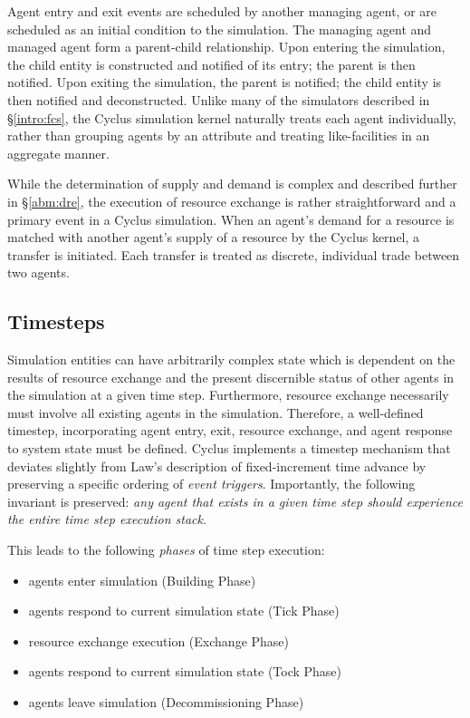 Agent entry and exit events are scheduled by another managing agent, or are
scheduled as an initial condition to the simulation. The managing agent and
managed agent form a parent-child relationship. Upon entering the simulation,
the child entity is constructed and notified of its entry; the parent is then
notified. Upon exiting the simulation, the parent is notified; the child entity
is then notified and deconstructed. Unlike many of the simulators described in
\S \ref{intro:fcs}, the Cyclus simulation kernel naturally treats each agent
individually, rather than grouping agents by an attribute and treating
like-facilities in an aggregate manner.

While the determination of supply and demand is complex and described further in
\S \ref{abm:dre}, the execution of resource exchange is rather straightforward
and a primary event in a Cyclus simulation. When an agent's demand for a
resource is matched with another agent's supply of a resource by the Cyclus
kernel, a transfer is initiated. Each transfer is treated as discrete,
individual trade between two agents.

\subsection{Timesteps}

Simulation entities can have arbitrarily complex state which is dependent on the
results of resource exchange and the present discernible status of other agents
in the simulation at a given time step. Furthermore, resource exchange
necessarily must involve all existing agents in the simulation. Therefore, a
well-defined timestep, incorporating agent entry, exit, resource exchange, and
agent response to system state must be defined. Cyclus implements a timestep
mechanism that deviates slightly from Law's description of fixed-increment time
advance by preserving a specific ordering of \textit{event
  triggers}. Importantly, the following invariant is preserved: \textit{any
  agent that exists in a given time step should experience the entire time step
  execution stack}.

This leads to the following \textit{phases} of time step execution:

\begin{itemize}
\item agents enter simulation (Building Phase)
\item agents respond to current simulation state (Tick Phase)
\item resource exchange execution (Exchange Phase)
\item agents respond to current simulation state (Tock Phase)
\item agents leave simulation (Decommissioning Phase)
\end{itemize}

